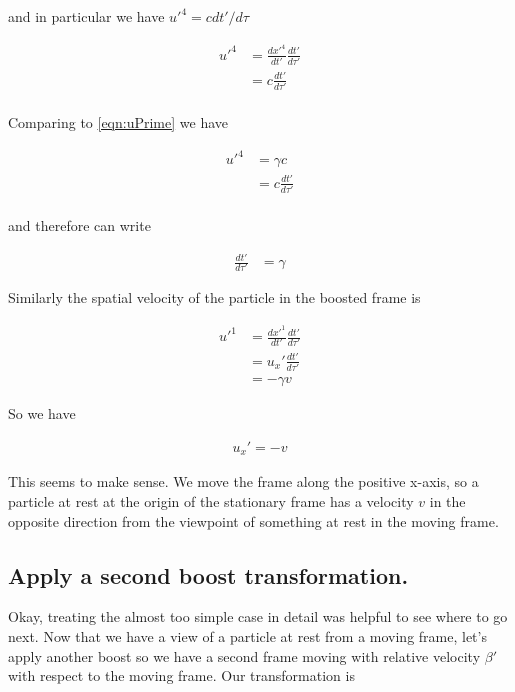 and in particular we have ${u'}^4 = c dt'/d\tau$ %

\begin{align*}
{u'}^4
&=
\frac{{dx'}^4}{dt'} \frac{{dt'}}{d\tau'} \\
&= c \frac{{dt'}}{d\tau'} \\
\end{align*}

Comparing to \ref{eqn:uPrime} we have

\begin{align*}
{u'}^4 
&= \gamma c \\
&= c \frac{{dt'}}{d\tau'} \\
\end{align*}

and therefore can write

\begin{align*}
\frac{{dt'}}{d\tau'} 
&= \gamma 
\end{align*}

Similarly the spatial velocity of the particle in the boosted frame is

\begin{align*}
{u'}^1
&=
\frac{{dx'}^1}{dt'} \frac{{dt'}}{d\tau'} \\
&= u_x' \frac{{dt'}}{d\tau'} \\
&= - \gamma v
\end{align*}

So we have 

\begin{align*}
u_x' = -v 
\end{align*}

This seems to make sense.  We move the frame along the positive x-axis, so a particle at rest at the origin of the stationary frame has a velocity $v$ in the opposite direction from the viewpoint of something at rest in the moving frame.

\subsection{Apply a second boost transformation. }

Okay, treating the almost too simple case in detail was helpful to see where to go next.  Now that we have a view of a particle at rest
from a moving frame, let's apply another boost so we have a second frame moving with relative velocity $\beta'$ with respect to the moving
frame.  Our transformation is

